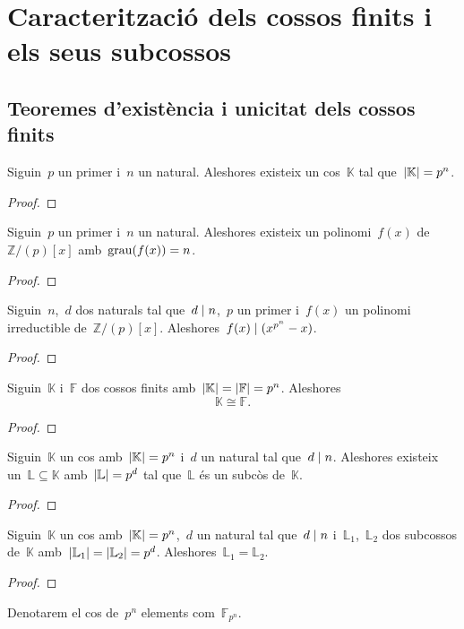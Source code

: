 \documentclass[../../Main.tex]{subfiles}
\begin{document}
\section{Caracterització dels cossos finits i els seus subcossos}
	\subsection{Teoremes d'existència i unicitat dels cossos finits}
	\begin{theorem}
		Siguin~\(p\) un primer i~\(n\) un natural.
		Aleshores existeix un cos~\(\mathbb{K}\) tal que~\(\abs{\mathbb{K}}=p^{n}\).
		\begin{proof}
		\end{proof}
	\end{theorem}
	\begin{corollary}
		Siguin~\(p\) un primer i~\(n\) un natural.
		Aleshores existeix un polinomi~\(f(x)\) de~\(\mathbb{Z}/(p)[x]\) amb~\(\operatorname{grau}(f(x))=n\).
		\begin{proof}
		\end{proof}
	\end{corollary}
	\begin{lemma}
		Siguin~\(n\),~\(d\) dos naturals tal que~\(d\mathrel{|} n\),~\(p\) un primer i~\(f(x)\) un polinomi irreductible de~\(\mathbb{Z}/(p)[x]\).
		Aleshores~\(f(x)\mathrel{|}(x^{p^{n}}-x)\).
		\begin{proof}
		\end{proof}
	\end{lemma}
	\begin{theorem}
		Siguin~\(\mathbb{K}\) i~\(\mathbb{F}\) dos cossos finits amb~\(\abs{\mathbb{K}}=\abs{\mathbb{F}}=p^{n}\).
		Aleshores %
		\[
		    \mathbb{K}\cong\mathbb{F}.
		\]
		\begin{proof}
		\end{proof}
	\end{theorem}
	\begin{theorem}
		Siguin~\(\mathbb{K}\) un cos amb~\(\abs{\mathbb{K}}=p^{n}\) i~\(d\) un natural tal que~\(d\mathrel{|} n\).
		Aleshores existeix un~\(\mathbb{L}\subseteq\mathbb{K}\) amb~\(\abs{\mathbb{L}}=p^{d}\) tal que~\(\mathbb{L}\) és un subcòs de~\(\mathbb{K}\).
		\begin{proof}
		\end{proof}
	\end{theorem}
	\begin{theorem}
		Siguin~\(\mathbb{K}\) un cos amb~\(\abs{\mathbb{K}}=p^{n}\),~\(d\) un natural tal que~\(d\mathrel{|} n\) i~\(\mathbb{L}_{1}\),~\(\mathbb{L}_{2}\) dos subcossos de~\(\mathbb{K}\) amb~\(\abs{\mathbb{L}_{1}}=\abs{\mathbb{L}_{2}}=p^{d}\).
		Aleshores~\(\mathbb{L}_{1}=\mathbb{L}_{2}\).
		\begin{proof}
		\end{proof}
	\end{theorem}
	\begin{notation}
		Denotarem el cos de~\(p^{n}\) elements com~\(\mathbb{F}_{p^{n}}\).
	\end{notation}
\end{document}
